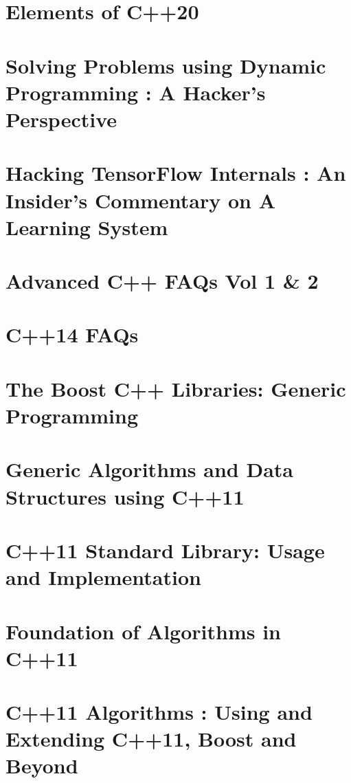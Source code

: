 \documentclass[makeidx, 12pt, oneside, onecolumn, openright, final, svgnames, dvipsnames, extrafontsizes]{memoir}
\theoremstyle{problemstyle}
\begin{document}
\chapter{Elements of C++20}

\chapter{Solving Problems using Dynamic Programming : A Hacker’s Perspective}



\chapter{Hacking TensorFlow Internals : An Insider’s Commentary on A Learning System}

\chapter{Advanced C++ FAQs Vol 1 \& 2}

\chapter{C++14 FAQs}

\chapter{The Boost C++ Libraries: Generic Programming}

\chapter{Generic Algorithms and Data Structures using C++11}

\chapter{C++11 Standard Library: Usage and Implementation}

\chapter{Foundation of Algorithms in C++11}

\chapter{C++11 Algorithms : Using and Extending C++11, Boost and Beyond}
\end{document}
